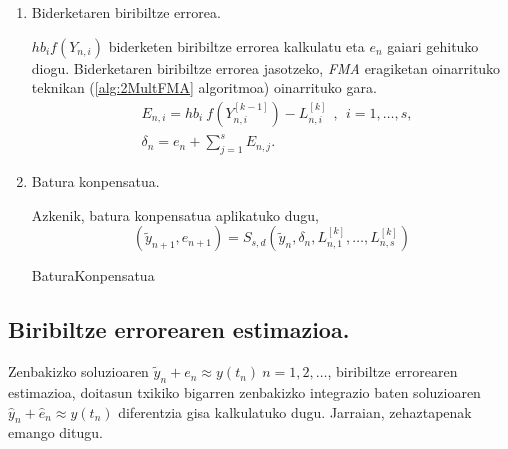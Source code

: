\begin{enumerate}
\item Biderketaren biribiltze errorea.

$hb_i f(Y_{n,i})$ biderketen biribiltze errorea kalkulatu eta $e_{n}$ gaiari gehituko diogu. Biderketaren biribiltze errorea jasotzeko,  \emph{FMA} eragiketan oinarrituko teknikan (\ref{alg:2MultFMA} algoritmoa) oinarrituko gara. 
\begin{align*}
&E_{n,i}=hb_i \ f(Y^{[k-1]}_{n,i}) - L^{[k]}_{n,i} \ \ , \ \ i=1,\dots,s,\\
&\delta_{n}={e}_{n} + \sum\limits_{j=1}^{s}E_{n,j}.
\end{align*}


\item Batura konpensatua.

Azkenik, batura konpensatua aplikatuko dugu,
\begin{equation}
\label{eq:bkLn}
(\tilde y_{n+1}, e_{n+1}) = S_{s,d}(\tilde y_n, \delta_n, L_{n,1}^{[k]}, \dots,L_{n,s}^{[k]})
\end{equation}

\begin{algorithm}[H]
  \SetAlgoLined\DontPrintSemicolon
  \caption{BaturaKonpensatua}
\end{algorithm} 

\end{enumerate}


\subsection{Biribiltze errorearen estimazioa.}
\label{ss:634}

Zenbakizko soluzioaren $\tilde{y}_n+e_n \approx y(t_n) \ n=1,2,\dots$, biribiltze errorearen estimazioa, doitasun txikiko  bigarren zenbakizko integrazio baten soluzioaren $\hat{y}_n+\hat{e}_n \approx y(t_n)$ diferentzia gisa kalkulatuko dugu.  Jarraian, zehaztapenak emango ditugu.

